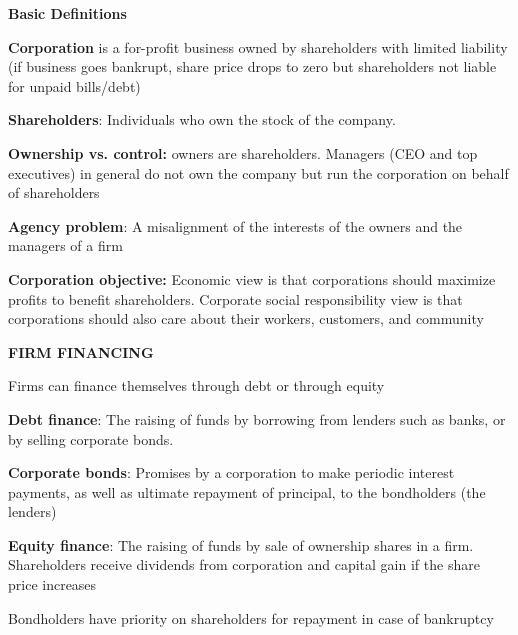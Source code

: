 \documentclass[landscape]{slides}
\begin{document}
\begin{slide}
\begin{center}
{\bf Basic Definitions}
\end{center}



{\bf Corporation} is a for-profit business owned by shareholders with limited liability
(if business goes bankrupt, share price drops to zero but shareholders not liable for unpaid bills/debt)



{\bf Shareholders}:
Individuals who own the stock of the company.



{\bf Ownership vs. control:} owners are shareholders. Managers (CEO and top executives) in general
do not own the company but run
the corporation on behalf of shareholders



{\bf Agency problem}:
A misalignment of the interests of the owners and the managers of a firm


{\bf Corporation objective:} Economic view is that corporations should 
maximize profits to benefit shareholders.
Corporate social responsibility view is that
corporations should also care about their workers, customers, and community

\end{slide}

%

\begin{slide}
\begin{center}
{\bf FIRM FINANCING}
\end{center}

Firms can finance themselves through debt or through equity

{\bf Debt finance}:
The raising of funds by borrowing from lenders such as banks, or by selling corporate bonds.

{\bf Corporate bonds}:
Promises by a corporation to make periodic interest payments, as well as ultimate repayment of principal, to the bondholders (the lenders)

{\bf Equity finance}: The raising of funds by sale of ownership shares in a firm. Shareholders receive
dividends from corporation and capital gain if the share price increases

Bondholders have priority on shareholders for repayment in case of bankruptcy

\end{slide}
\end{document}

